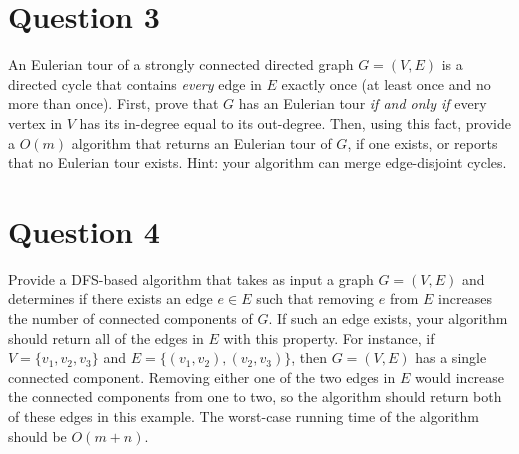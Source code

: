 \documentclass{article}
\begin{document}
\section*{Question 3}
An Eulerian tour of a strongly connected directed graph $G=(V, E)$ is a directed cycle that contains {\em every} edge in $E$ exactly once (at least once and no more than once).
First, prove that $G$ has an Eulerian tour {\em if and only if} every vertex in $V$ has its in-degree equal to its out-degree.
Then, using this fact, provide a $O(m)$ algorithm that returns an Eulerian tour of $G$, if one exists, or reports that no Eulerian tour exists.
Hint: your algorithm can merge edge-disjoint cycles.

\section*{Question 4}
Provide a DFS-based algorithm that takes as input a graph $G=(V,E)$ and determines if there exists an edge $e\in E$ such that removing $e$ from $E$ increases the number of connected components of $G$.
If such an edge exists, your algorithm should return all of the edges in $E$ with this property.
For instance, if $V=\{v_1, v_2, v_3\}$ and $E=\{(v_1, v_2), (v_2, v_3)\}$, then $G=(V,E)$ has a single connected component.
Removing either one of the two edges in $E$ would increase the connected components from one to two, so the algorithm should return both of these edges in this example.
The worst-case running time of the algorithm should be $O(m+n)$.
\end{document}
